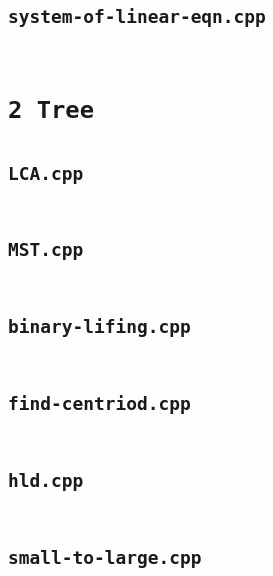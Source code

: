 \subsection*{\texttt{system-of-linear-eqn.cpp}} \label{sec:1_1_Number_Theory_file5}
\inputminted[fontsize=\footnotesize, linenos, breaklines]{cpp}{./1\ Number\ Theory/system-of-linear-eqn.cpp}

\section*{\texttt{2 Tree}} \label{sec:2_2_Tree}
\subsection*{\texttt{LCA.cpp}} \label{sec:2_2_Tree_file0}
\inputminted[fontsize=\footnotesize, linenos, breaklines]{cpp}{./2\ Tree/LCA.cpp}

\subsection*{\texttt{MST.cpp}} \label{sec:2_2_Tree_file1}
\inputminted[fontsize=\footnotesize, linenos, breaklines]{cpp}{./2\ Tree/MST.cpp}

\subsection*{\texttt{binary-lifing.cpp}} \label{sec:2_2_Tree_file2}
\inputminted[fontsize=\footnotesize, linenos, breaklines]{cpp}{./2\ Tree/binary-lifing.cpp}

\subsection*{\texttt{find-centriod.cpp}} \label{sec:2_2_Tree_file3}
\inputminted[fontsize=\footnotesize, linenos, breaklines]{cpp}{./2\ Tree/find-centriod.cpp}

\subsection*{\texttt{hld.cpp}} \label{sec:2_2_Tree_file4}
\inputminted[fontsize=\footnotesize, linenos, breaklines]{cpp}{./2\ Tree/hld.cpp}

\subsection*{\texttt{small-to-large.cpp}} \label{sec:2_2_Tree_file5}
\inputminted[fontsize=\footnotesize, linenos, breaklines]{cpp}{./2\ Tree/small-to-large.cpp}

